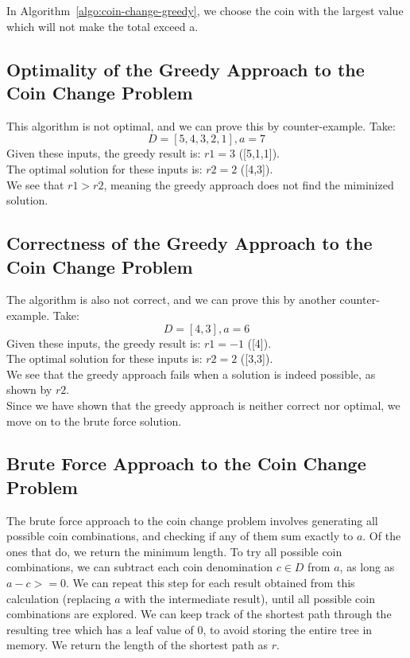 In Algorithm~\ref{algo:coin-change-greedy}, we choose the coin with the largest value which will not make the total exceed a.

\subsection{Optimality of the Greedy Approach to the Coin Change Problem}

This algorithm is not optimal, and we can prove this by counter-example.
Take:$$D = [5,4,3,2,1], a = 7$$Given these inputs, the greedy result is: $r1 = 3$  ([5,1,1]).\\
The optimal solution for these inputs is: $r2 = 2$ ([4,3]).\\
We see that $r1 > r2$, meaning the greedy approach does not find the miminized solution.

\subsection{Correctness of the Greedy Approach to the Coin Change Problem}

The algorithm is also not correct, and we can prove this by another counter-example.
Take:$$D = [4,3],a = 6$$Given these inputs, the greedy result is: $r1 = -1$  ([4]).\\
The optimal solution for these inputs is: $r2 = 2$ ([3,3]).\\
We see that the greedy approach fails when a solution is indeed possible, as shown by $r2$.\\
Since we have shown that the greedy approach is neither correct nor optimal, we move on to the brute force solution.\\


\subsection{Brute Force Approach to the Coin Change Problem}

The brute force approach to the coin change problem involves generating all possible coin combinations, and checking if any of them sum exactly to $a$.
Of the ones that do, we return the minimum length.
To try all possible coin combinations, we can subtract each coin denomination $c \in D$ from $a$, as long as $a - c >= 0$.
We can repeat this step for each result obtained from this calculation (replacing $a$ with the intermediate result), until all possible coin combinations are explored.
We can keep track of the shortest path through the resulting tree which has a leaf value of 0, to avoid storing the entire tree in memory.
We return the length of the shortest path as $r$.\\



